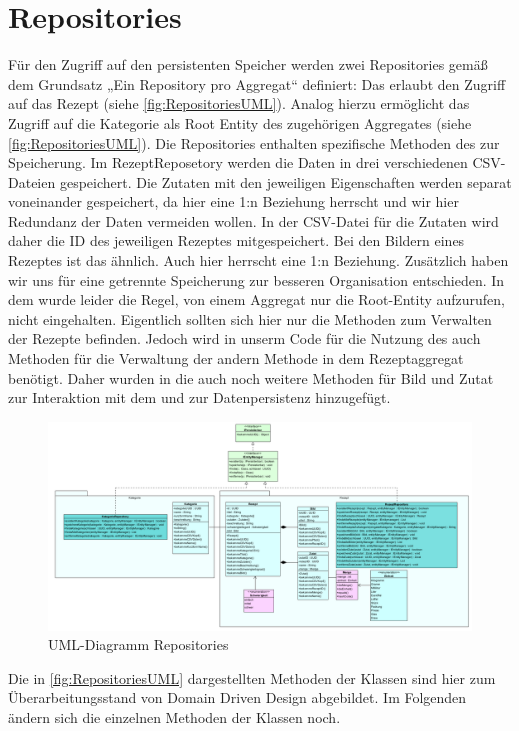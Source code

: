 \section{Repositories}
Für den Zugriff auf den persistenten Speicher werden zwei Repositories gemäß dem Grundsatz „Ein Repository pro Aggregat“ definiert: Das \href{https://github.com/MichaelaHaag/RezeptApp/tree/main/3-Domain-Code/src/main/java/de/rezeptapp/domain/Rezept/RezeptRepository.java}{} erlaubt den Zugriff auf das Rezept (siehe \autoref{fig:RepositoriesUML}). Analog hierzu ermöglicht das \href{https://github.com/MichaelaHaag/RezeptApp/blob/main/3-Domain-Code/src/main/java/de/rezeptapp/domain/Kategorie/KategorieRepository.java}{} Zugriff auf die Kategorie als Root Entity des zugehörigen Aggregates (siehe \autoref{fig:RepositoriesUML}). Die Repositories enthalten spezifische Methoden des  zur Speicherung. Im RezeptReposetory werden die Daten in drei verschiedenen CSV-Dateien gespeichert. Die Zutaten mit den jeweiligen Eigenschaften werden separat voneinander gespeichert, da hier eine 1:n Beziehung herrscht und wir hier Redundanz der Daten vermeiden wollen. In der CSV-Datei für die Zutaten wird daher die ID des jeweiligen Rezeptes mitgespeichert. Bei den Bildern eines Rezeptes ist das ähnlich. Auch hier herrscht eine 1:n Beziehung. Zusätzlich haben wir uns für eine getrennte Speicherung zur besseren Organisation entschieden. 
In dem  wurde leider die Regel, von einem Aggregat nur die Root-Entity aufzurufen, nicht eingehalten. Eigentlich sollten sich hier nur die Methoden zum Verwalten der Rezepte befinden. Jedoch wird in unserm Code für die Nutzung des  auch Methoden für die Verwaltung der andern Methode in dem Rezeptaggregat benötigt. Daher wurden in die  auch noch weitere Methoden für Bild und Zutat zur Interaktion mit dem  und zur Datenpersistenz hinzugefügt.

\begin{figure}[ht]
	\centering
	\includegraphics[width=1.0\textwidth]{Bilder/Reposetory-UML.png} 
	\caption{UML-Diagramm Repositories}
	\label{fig:RepositoriesUML}
\end{figure}
Die in \autoref{fig:RepositoriesUML} dargestellten Methoden der Klassen sind hier zum Überarbeitungsstand von Domain Driven Design abgebildet. Im Folgenden ändern sich die einzelnen Methoden der Klassen noch.  
